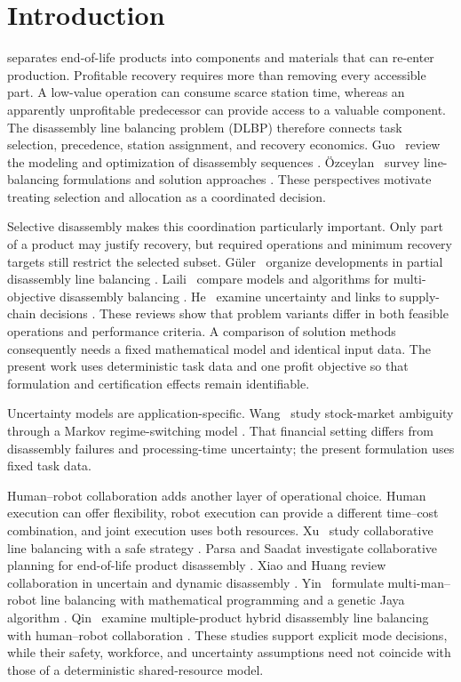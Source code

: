 \section{Introduction}\label{sec:intro}
 separates end-of-life products into components and materials that can re-enter production. Profitable recovery requires more than removing every accessible part. A low-value operation can consume scarce station time, whereas an apparently unprofitable predecessor can provide access to a valuable component. The disassembly line balancing problem (DLBP) therefore connects task selection, precedence, station assignment, and recovery economics. Guo \etal\ review the modeling and optimization of disassembly sequences \cite{Guo2021}. \"Ozceylan \etal\ survey line-balancing formulations and solution approaches \cite{Ozceylan2019}. These perspectives motivate treating selection and allocation as a coordinated decision.

Selective disassembly makes this coordination particularly important. Only part of a product may justify recovery, but required operations and minimum recovery targets still restrict the selected subset. G\"uler \etal\ organize developments in partial disassembly line balancing \cite{Guler2024}. Laili \etal\ compare models and algorithms for multi-objective disassembly balancing \cite{Laili2020}. He \etal\ examine uncertainty and links to supply-chain decisions \cite{He2024}. These reviews show that problem variants differ in both feasible operations and performance criteria. A comparison of solution methods consequently needs a fixed mathematical model and identical input data. The present work uses deterministic task data and one profit objective so that formulation and certification effects remain identifiable.

Uncertainty models are application-specific. Wang \etal\ study stock-market ambiguity through a Markov regime-switching model \cite{Wang2021Markov}. That financial setting differs from disassembly failures and processing-time uncertainty; the present formulation uses fixed task data.

Human--robot collaboration adds another layer of operational choice. Human execution can offer flexibility, robot execution can provide a different time--cost combination, and joint execution uses both resources. Xu \etal\ study collaborative line balancing with a safe strategy \cite{Xu2021}. Parsa and Saadat investigate collaborative planning for end-of-life product disassembly \cite{Parsa2021}. Xiao and Huang review collaboration in uncertain and dynamic disassembly \cite{Xiao2024}. Yin \etal\ formulate multi-man--robot line balancing with mathematical programming and a genetic Jaya algorithm \cite{Yin2025}. Qin \etal\ examine multiple-product hybrid disassembly line balancing with human--robot collaboration \cite{Qin2025Hybrid}. These studies support explicit mode decisions, while their safety, workforce, and uncertainty assumptions need not coincide with those of a deterministic shared-resource model.

